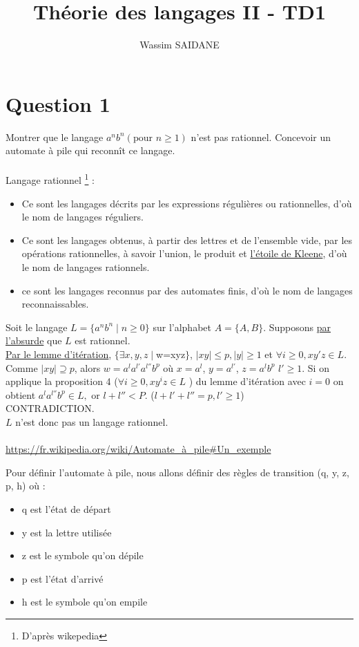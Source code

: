 \documentclass{article}
\title{Théorie des langages II - TD1}
\author{Wassim SAIDANE}
\date{}
\begin{document}
    \maketitle
    \section*{Question 1}
    Montrer  que  le  langage $a^nb^n(\text{pour } n \ge 1)$  n’est  pas  rationnel.  Concevoir  un automate à pile qui reconnît ce langage. \\
    \\
    Langage rationnel \footnote{D'après wikepedia} : \\
    \begin{itemize}
        \item Ce sont les langages décrits par les expressions régulières ou rationnelles, d'où le nom de langages réguliers.
        \item Ce sont les langages obtenus, à partir des lettres et de l'ensemble vide, par les opérations rationnelles, à savoir l'union, le produit et \href{https://fr.wikipedia.org/wiki/Étoile_de_Kleene}{l'étoile de Kleene}, d'où le nom de langages rationnels.
        \item ce sont les langages reconnus par des automates finis, d'où le nom de langages reconnaissables.
    \end{itemize} 
    Soit le langage $L=\{a^nb^n \mid n \ge 0\}$ sur l'alphabet $A=\{A,B\}$. Supposons \underline{par l'absurde} que $L$ est rationnel. \\
    \href{https://fr.wikipedia.org/wiki/Lemme_de_l%27étoile}{\underline{Par le lemme d'itération}}, $\{\exists x,y,z \mid $w=xyz$\}$, $\mid xy \mid \le p, \mid y \mid \ge 1$ 
    et $\forall i \ge 0, xy'z \in L$. \\
    Comme $\mid xy \mid \supseteq p$, alors $w=a^la^{l'}a^{l''}b^p$ où $x=a^l$, $y=a^{l'}$, $z=a^lb^p$ $l' \ge 1$. Si on applique la proposition 4 ($\forall i \ge 0, xy^iz \in L$ )
    du lemme d'itération avec $i=0$ on obtient $a^la^{l''}b^p \in L,$ or $l+l'' < P$. ($l+l'+l''=p, l' \ge 1$) \\
    CONTRADICTION. \\
    $L$ n'est donc pas un langage rationnel. \\
    \\
    \url{https://fr.wikipedia.org/wiki/Automate_à_pile#Un_exemple}

    Pour définir l'automate à pile, nous allons définir des règles de transition (q, y, z, p, h) où :
    \begin{itemize}
        \item q est l'état de départ
        \item y est la lettre utilisée
        \item z est le symbole qu'on dépile
        \item p est l'état d'arrivé
        \item h est le symbole qu'on empile
    \end{itemize}
\end{document}
